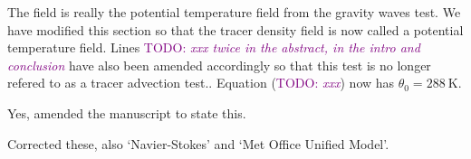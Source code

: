 \documentclass{article}
\newcommand{\TODO}[1]{\textcolor{purple}{TODO: \emph{#1}}}
\begin{document}
\begin{quotation}
	\begin{comment}
	\item Line 445: While it is mathematically possible to initialize the tracer density with 288 (needs physical units!) at the ground, it does not make any physical sense. However, it is okay to leave it for this idealized test case, but a more physical choice is clearly more desirable.
	\end{comment}
\end{quotation}
The field is really the potential temperature field from the gravity waves test.  We have modified this section so that the tracer density field is now called a potential temperature field.  Lines \TODO{xxx twice in the abstract, in the intro and conclusion} have also been amended accordingly so that this test is no longer refered to as a tracer advection test..  Equation (\TODO{xxx}) now has $\theta_0 = \SI{288}{\kelvin}$.

\begin{quotation}
	\begin{comment}
	\item Line 449: Do you refer to the normalized $\ell_2$ error here?
	\end{comment}
\end{quotation}
Yes, amended the manuscript to state this.
\begin{quotation}
	\begin{comment}
	\item Check the references for some phrases that need to be capitalized, as e.g. Appalachian in line 571 or Lagrangian in line 567 
	\end{comment}
\end{quotation}
Corrected these, also `Navier-Stokes' and `Met Office Unified Model'.



\end{document}
